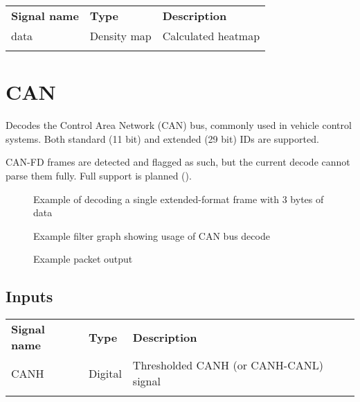 \begin{tabularx}{16cm}{llX}
\thickhline
\textbf{Signal name} & \textbf{Type} & \textbf{Description} \\
\thickhline
data & Density map & Calculated heatmap \\
\thickhline
\end{tabularx}

\pagebreak
\section{CAN}
\label{filter:can}

Decodes the Control Area Network (CAN) bus, commonly used in vehicle control systems. Both standard (11 bit) and
extended (29 bit) IDs are supported.

CAN-FD frames are detected and flagged as such, but the current decode cannot parse them fully. Full support is planned
().

\begin{figure}[h]
\centering
{}
\caption{Example of decoding a single extended-format frame with 3 bytes of data}
\label{filter_can}
\end{figure}

\begin{figure}[h]
\centering
{}
\caption{Example filter graph showing usage of CAN bus decode}
\label{filter_graph_can}
\end{figure}

\begin{figure}[h]
\centering
{}
\caption{Example packet output}
\label{packet_can}
\end{figure}

\FloatBarrier

\subsection{Inputs}

\begin{tabularx}{16cm}{llX}
\thickhline
\textbf{Signal name} & \textbf{Type} & \textbf{Description} \\
\thickhline
CANH & Digital & Thresholded CANH (or CANH-CANL) signal \\
\thickhline
\end{tabularx}

